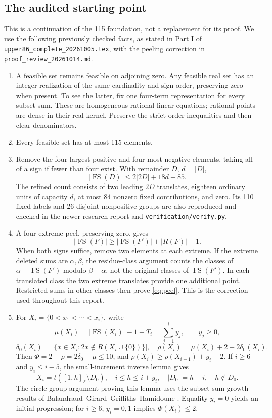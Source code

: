 \documentclass[11pt,a4paper]{article}
\newcommand{\FS}{\operatorname{FS}}
\newcommand{\Z}{\mathbb Z}
\begin{document}
\subsection{The audited starting point}
This is a continuation of the 115 foundation, not a replacement for its
proof. We use the following previously checked facts, as stated in Part I
of \texttt{upper86\_complete\_20261005.tex}, with the peeling correction in
\texttt{proof\_review\_20261014.md}.
\begin{enumerate}
\item A feasible set remains feasible on adjoining zero. Any feasible real
set has an integer realization of the same cardinality and sign order,
preserving zero when present. To see the latter, fix one four-term
representation for every subset sum. These are homogeneous rational linear
equations; rational points are dense in their real kernel. Preserve the
strict order inequalities and then clear denominators.
\item Every feasible set has at most 115 elements.
\item Remove the four largest positive and four most negative elements,
taking all of a sign if fewer than four exist. With remainder $D$, $d=|D|$,
\begin{equation}\label{eq:cover}
 |\FS(D)|\le2|2D|+18d+85.
\end{equation}
The refined count consists of two leading $2D$ translates, eighteen
ordinary units of capacity $d$, at most 84 nonzero fixed contributions,
and zero. Its 110 fixed labels and 26 disjoint nonpositive groups are
also reproduced and checked in the newer research report and
\texttt{verification/verify.py}.
\item A four-extreme peel, preserving zero, gives
\begin{equation}\label{eq:peel}
 |\FS(F)|\ge|\FS(F')|+|R(F)|-1.
\end{equation}
When both signs suffice, remove two elements at each extreme. If the
extreme deleted sums are $\alpha,\beta$, the residue-class argument counts
the classes of $\alpha+\FS(F')$ modulo $\beta-\alpha$, not the original
classes of $\FS(F')$. In each translated class the two extreme translates
provide one additional point. Restricted sums in other classes then prove
\eqref{eq:peel}. This is the correction used throughout this report.
\item For $X_i=\{0<x_1<\cdots<x_i\}$, write
\[
 \mu(X_i)=|\FS(X_i)|-1-T_i=\sum_{j=1}^i y_j,\qquad y_j\ge0,
\]
\[
 \delta_0(X_i)=|\{x\in X_i:2x\notin R(X_i\cup\{0\})\}|,
 \quad\rho(X_i)=\mu(X_i)+2-2\delta_0(X_i).
\]
Then $\Phi=2-\rho=2\delta_0-\mu\le10$, and
$\rho(X_i)\ge\rho(X_{i-1})+y_i-2$. If $i\ge6$ and $y_i\le i-5$,
the small-increment inverse lemma gives
\begin{equation}\label{eq:small-inverse}
 X_i=t([1,h]_{\Z}\setminus D_0),\quad i\le h\le i+y_i,
 \quad |D_0|=h-i,\quad h\notin D_0.
\end{equation}
The circle-group argument proving this lemma uses the subset-sum growth
results of Balandraud--Girard--Griffiths--Hamidoune \cite{BGGH}.
Equality $y_i=0$ yields an initial progression; for $i\ge6$, $y_i=0,1$
implies $\Phi(X_i)\le2$.
\end{enumerate}
\end{document}
